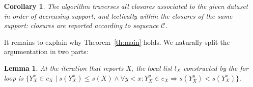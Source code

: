 \documentclass{article}
\newtheorem{remark}{Remark}
\newtheorem{lemma}{Lemma}
\newtheorem{corollary}{Corollary}
\def\U{\mathcal{U}}
\def\C{\mathcal{C}}
\def\s{\mathit{s}}
\def\bef{\prec}
\begin{document}
\begin{corollary}
The algorithm traverses all closures associated to the given
dataset in order of decreasing support, and lectically
within the closures of the same support: closures are
reported according to sequence $\C$. 
\end{corollary}

It remains to explain why Theorem~\ref{th:main} holds. We naturally split
the argumentation in two parts:







\begin{lemma}\label{lem:locallist}
At the iteration that reports $X$, the local list $l_X$ constructed
by the for loop is 
$\{Y^x_X \in c_X \mid
\s(Y^x_X) \leq \s(X) \land
\forall y<x: 
Y^y_X \in c_X \Rightarrow \s(Y^y_X) < \s(Y^x_X) 
\}.
$
\end{lemma}
\end{document}
